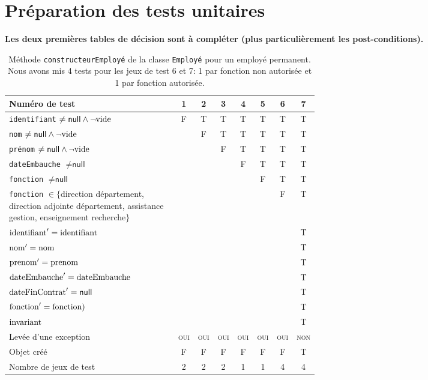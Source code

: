 \documentclass[11pt,article]{article}
\newcommand{\nullvalue}{\textsf{null}\xspace}
\newcommand{\invariant}{\ensuremath\mathrm{invariant}}
\begin{document}
\newpage

\section{Préparation des tests unitaires}

{\color{red}\textbf{Les deux premières tables de décision sont à
    compléter (plus particulièrement les post-conditions).}}

\begin{table}[!ht]
\begin{center}
\begin{tabular}{|p{0.6\linewidth}|c|c|c|c|c|c|c|}
\hline
Numéro de test
&1&2&3&4&5&6&7\\
\hline
\hline
\texttt{identifiant} $\neq \nullvalue \land \neg \emptystring$
&F&T&T&T&T&T&T\\
\hline
\texttt{nom} $\neq \nullvalue \land \neg \emptystring$
& &F&T&T&T&T&T\\
\hline
\texttt{prénom} $\neq \nullvalue \land \neg \emptystring$
& & &F&T&T&T&T\\
\hline
\texttt{dateEmbauche} $\neq \nullvalue$
& & & &F&T&T&T\\
\hline
\texttt{fonction} $\neq \nullvalue$
& & & & &F&T&T\\
\hline
\texttt{fonction} $\in \{$direction département, direction adjointe
département, assistance gestion, enseignement recherche$\}$
& & & & & &F&T\\
\hline
\hline
$\mathrm{identifiant}' = \mathrm{identifiant}$
& & & & & & &T\\
\hline
$\mathrm{nom}' = \mathrm{nom}$
& & & & & & &T\\
\hline
$\mathrm{prenom}' = \mathrm{prenom}$
& & & & & & &T\\
\hline
$\mathrm{dateEmbauche}' = \mathrm{dateEmbauche}$
& & & & & & &T\\
\hline
$\dateFinContrat' = \nullvalue$
& & & & & & &T\\
\hline
$\mathrm{fonction}' = \mathrm{fonction})$
& & & & & & &T\\
\hline
$\invariant$
& & & & & & &T\\
\hline
Levée d'une exception&\textsc{oui}&\textsc{oui}&\textsc{oui}&\textsc{oui}&\textsc{oui}&\textsc{oui}&\textsc{non}\\
\hline
\hline
Objet créé
&F&F&F&F&F&F&T\\
\hline
\hline
Nombre de jeux de test 
&2&2&2&1&1&4&4\\
\hline
\end{tabular}
\caption{Méthode \texttt{constructeurEmployé} de la classe
  \texttt{Employé} pour un employé permanent. Nous avons mis 4
  tests pour les jeux de test 6 et 7: 1 par fonction non autorisée et
  1 par fonction autorisée.}
\end{center}
\end{table}
\end{document}
